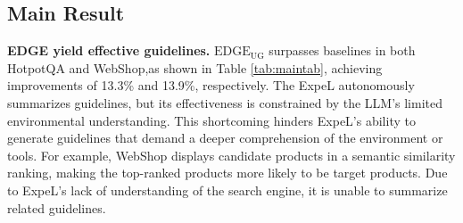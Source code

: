 



\subsection{Main Result}


\textbf{EDGE yield effective guidelines.}
$\text{EDGE}_\text{UG}$ surpasses baselines in both HotpotQA and WebShop,as shown in Table \ref{tab:maintab}, achieving improvements of 13.3\% and 13.9\%, respectively. 
The ExpeL autonomously summarizes guidelines, but its effectiveness is constrained by the LLM's limited environmental understanding. This shortcoming hinders ExpeL's ability to generate guidelines that demand a deeper comprehension of the environment or tools. For example, WebShop displays candidate products in a semantic similarity ranking, making the top-ranked products more likely to be target products. Due to ExpeL's lack of understanding of the search engine, it is unable to summarize related guidelines.

